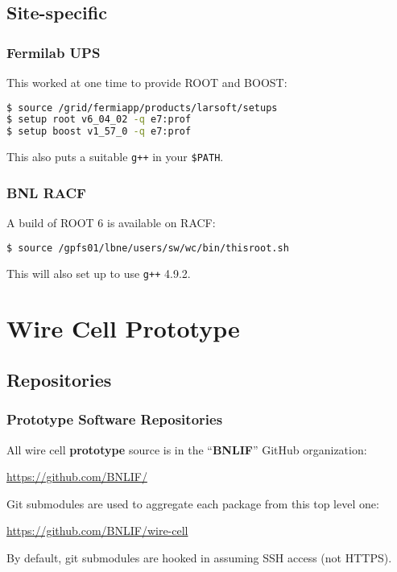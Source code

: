 \documentclass[xcolor=dvipsnames]{beamer}
\begin{document}
\subsection{Site-specific}

\begin{frame}[fragile]
  \frametitle{Fermilab UPS}
  This worked at one time to provide ROOT and BOOST:
\begin{lstlisting}[language=sh]
$ source /grid/fermiapp/products/larsoft/setups
$ setup root v6_04_02 -q e7:prof
$ setup boost v1_57_0 -q e7:prof
\end{lstlisting}

  This also puts a suitable \texttt{g++} in your \texttt{\$PATH}.

\end{frame}

\begin{frame}[fragile]
  \frametitle{BNL RACF}
  A build of ROOT 6 is available on RACF:

\begin{lstlisting}[language=sh]
$ source /gpfs01/lbne/users/sw/wc/bin/thisroot.sh
\end{lstlisting}

This will also set up to use \texttt{g++} 4.9.2.

\end{frame}

\section{Wire Cell Prototype}

\subsection{Repositories}

\begin{frame}
  \frametitle{Prototype Software Repositories}

  All wire cell \textbf{prototype} source is in the ``\textbf{BNLIF}'' GitHub organization:

  \begin{center}
    \url{https://github.com/BNLIF/}
  \end{center}

  Git submodules are used to aggregate each package from this top level one:

  \begin{center}
    \url{https://github.com/BNLIF/wire-cell}
  \end{center}

  By default, git submodules are hooked in assuming SSH access (not HTTPS).

\end{frame}
\end{document}
